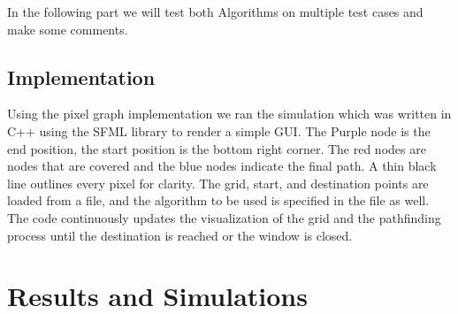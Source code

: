 \documentclass[twocolumn]{article}
\begin{document}
In the following part we will test both Algorithms on multiple test cases and make some comments.

\subsection{Implementation}
Using the pixel graph implementation we ran the simulation which was written in C++ using the SFML library to render a simple GUI. The Purple node is the end position, the start position is the bottom right corner. The red nodes are nodes that are covered and the blue nodes indicate the final path. A thin black line outlines every pixel for clarity. The grid, start, and destination points are loaded from a file, and the algorithm to be used is specified in the file as well. The code continuously updates the visualization of the grid and the pathfinding process until the destination is reached or the window is closed.

\section{Results and Simulations}
\end{document}

